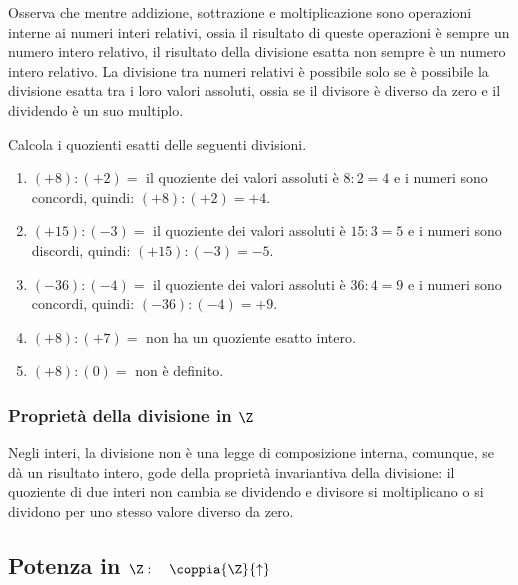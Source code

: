 Osserva che mentre addizione, sottrazione e moltiplicazione sono operazioni 
interne ai numeri interi relativi, ossia 
il risultato di queste operazioni è sempre un numero intero relativo, il 
risultato della divisione esatta non 
sempre è un numero intero relativo. 
La divisione tra numeri relativi è possibile solo se è possibile la 
divisione esatta tra i loro valori assoluti, ossia se
il divisore è diverso da zero e il dividendo è un suo multiplo.

\begin{esempio}{}{}
Calcola i quozienti esatti delle seguenti divisioni.
\begin{enumerate}[noitemsep, label=(\alph*)]
\item \((+8) : (+2)=\) 
il quoziente dei valori assoluti è \(8 : 2 = 4\) 
e i numeri sono concordi, quindi: \((+8) : (+2) = +4\).
\item \((+15) : (-3) =\) 
il quoziente dei valori assoluti è \(15 : 3 = 5\) 
e i numeri sono discordi, quindi: \((+15) : (-3) = -5\).
\item \((-36) : (-4) =\) 
il quoziente dei valori assoluti è \(36 : 4 = 9\) 
e i numeri sono concordi, quindi: \((-36) : (-4) = +9\).
\item \((+8) : (+7) =\) non ha un quoziente esatto intero.
\item \((+8) : (0) =\) non è definito.
\end{enumerate}
\end{esempio}

\subsubsection{Proprietà della divisione in \texorpdfstring{$\Z$}{Z}}

Negli interi, la divisione non è una legge di composizione interna, 
comunque, se dà un risultato intero, gode della proprietà 
invariantiva 
della divisione: 
il quoziente di due interi non cambia se dividendo e divisore si 
moltiplicano o si dividono per uno stesso valore diverso da zero.



\subsection{Potenza in 
\texorpdfstring{$\Z: \quad \coppia{\Z}{\uparrow}$}{Z: (Z; ^)}}

